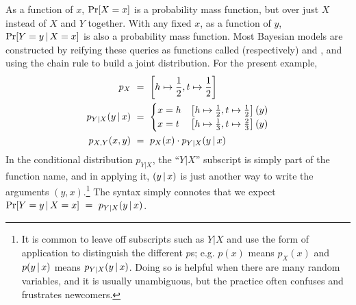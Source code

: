 As a function of $x$, $\mathrm{Pr}\!\left[{X = x}\right]$ is a probability mass function, but over just $X$ instead of $X$ and $Y$ together.
With any fixed $x$, as a function of $y$, $\mathrm{Pr}\!\left[{Y = y \,|\, X = x}\right]$ is also a probability mass function.
Most Bayesian models are constructed by reifying these queries as functions called (respectively)  and , and using the chain rule to build a joint distribution.
For the present example,
\begin{equation}
\begin{aligned}
	p_X&\ =\ \left[h \mapsto \frac{1}{2}, t \mapsto \frac{1}{2}\right]
\\
	p_{Y|X}(y \,|\, x)&\ =\
	\begin{cases}
		x = h & \left[h \mapsto \frac{1}{2}, t \mapsto \frac{1}{2}\right](y) \\
		x = t & \left[h \mapsto \frac{1}{3}, t \mapsto \frac{2}{3}\right](y)
	\end{cases}
\\
	p_{X,Y}(x,y)&\ =\ p_X(x) \cdot p_{Y|X}(y \,|\, x)
\end{aligned}
\end{equation}
In the conditional distribution $p_{Y|X}$, the ``$Y|X$'' subscript is simply part of the function name, and in applying it, $(y \,|\, x)$ is just another way to write the arguments $(y,x)$.\footnote{It is common to leave off subscripts such as $Y|X$ and use the form of application to distinguish the different $p$s; e.g. $p(x)$ means $p_X(x)$ and $p(y \,|\, x)$ means $p_{Y|X}(y \,|\, x)$. Doing so is helpful when there are many random variables, and it is usually unambiguous, but the practice often confuses and frustrates newcomers.}
The syntax simply connotes that we expect $\Pspec{Y = y \given X = x}\ =\ p_{Y|X}(y \given x)$.

